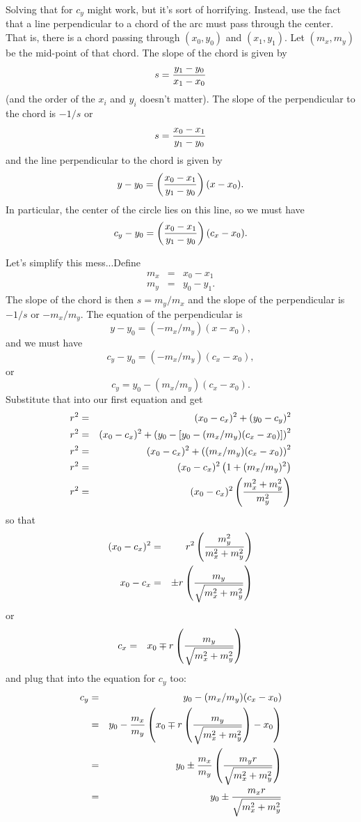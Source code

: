 \documentclass[titlepage,oneside,10pt]{article}
\begin{document}
Solving that for $c_y$ might work, but it's sort of
horrifying. Instead, use the fact that a line perpendicular to a chord
of the arc must pass through the center. That is, there is a chord
passing through $(x_0,y_0)$ and $(x_1,y_1)$. Let $(m_x,m_y)$ be the
mid-point of that chord. The slope of the chord is given by
$$s = {y_1-y_0\over x_1-x_0}$$
(and the order of the $x_i$ and $y_i$ doesn't matter). The slope of
the perpendicular to the chord is $-1/s$ or
$$s = {x_0-x_1\over y_1-y_0}$$
and the line perpendicular to the chord is given by
$$y - y_0 = \left({x_0-x_1\over y_1-y_0}\right) (x-x_0).$$
In particular, the center of the circle lies on this line, so we must
have
$$c_y - y_0 = \left({x_0-x_1\over y_1-y_0}\right) (c_x-x_0).$$

Let's simplify this mess...Define
\begin{eqnarray*}
  m_x &=& x_0-x_1\\
  m_y &=& y_0-y_1.
\end{eqnarray*}
The slope of the chord is then $s = m_y/m_x$ and the slope of the
perpendicular is $-1/s$ or $-m_x/m_y$. The equation of the perpendicular is
$$y - y_0 = (-m_x/m_y) (x-x_0),$$
and we must have
$$c_y - y_0 = (-m_x/m_y) (c_x-x_0),$$
or
$$c_y  = y_0 - (m_x/m_y) (c_x-x_0).$$
Substitute that into our first equation and get
\begin{eqnarray*}
  r^2 &=& (x_0-c_x)^2 + (y_0-c_y)^2 \\
  r^2 &=& (x_0-c_x)^2 + \left(y_0-\left[y_0 - (m_x/m_y) (c_x-x_0)\right]\right)^2 \\
  r^2 &=& (x_0-c_x)^2 + \left((m_x/m_y) (c_x-x_0)\right)^2 \\
  r^2 &=& (x_0-c_x)^2\left(1 + (m_x/m_y)^2\right) \\
  r^2 &=& (x_0-c_x)^2\left({m_x^2+m_y^2\over m_y^2}\right) \\
\end{eqnarray*}
so that
\begin{eqnarray*}
  (x_0-c_x)^2 &=& r^2 \left({m_y^2\over m_x^2+m_y^2}\right) \\
  x_0-c_x &=& \pm r \left({m_y\over \sqrt{m_x^2+m_y^2}}\right) \\
\end{eqnarray*}
or
\begin{eqnarray*}
  c_x &=& x_0 \mp r \left({m_y\over \sqrt{m_x^2+m_y^2}}\right) \\
\end{eqnarray*}
and plug that into the equation for $c_y$ too:
\begin{eqnarray*}
  c_y &=& y_0 - (m_x/m_y) (c_x-x_0) \\
  &=& y_0 - {m_x\over m_y} \left(x_0 \mp r \left({m_y\over
    \sqrt{m_x^2+m_y^2}}\right) - x_0\right) \\
  &=& y_0 \pm {m_x\over m_y} \left({m_yr \over \sqrt{m_x^2+m_y^2}}\right) \\
  &=& y_0 \pm {m_xr \over \sqrt{m_x^2+m_y^2}} \\
\end{eqnarray*}
\end{document}
